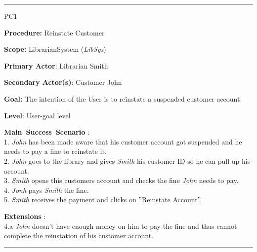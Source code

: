 \vspace{0.5cm}
\hrule
\begin{lyxlist}{PC1}
\small{
\item [\textbf{Procedure:}] Reinstate Customer
\item [\textbf{Scope:}] LibrarianSystem (\emph{LibSys})
\item [\textbf{Primary Actor}:] Librarian Smith
\item [\textbf{Secondary Actor(s)}:] Customer John
\item [\textbf{Goal:}] The intention of the User is to reinstate a suspended
customer account.
\item [\textbf{Level}:] User-goal level
\item [\textbf{Main~Success~Scenario}]:\\
1. \emph{John} has been made aware that his customer account got suspended
and he needs to pay a fine to reinstate it.\\
2. \emph{John} goes to the library and gives \emph{Smith} his customer ID so
he can pull up his account.\\
3. \emph{Smith} opens this customers account and checks the fine \emph{John}
needs to pay.\\
4. \emph{Jonh} pays \emph{Smith} the fine.\\
5. \emph{Smith} receives the payment and clicks on ''Reinstate Account''.\\

\item [\textbf{Extensions}]:\\
4.a \emph{John} doesn't have enough money on him to pay the fine and thus
cannot complete the reinstation of his customer account.\\
}

\end{lyxlist}
\hrule

